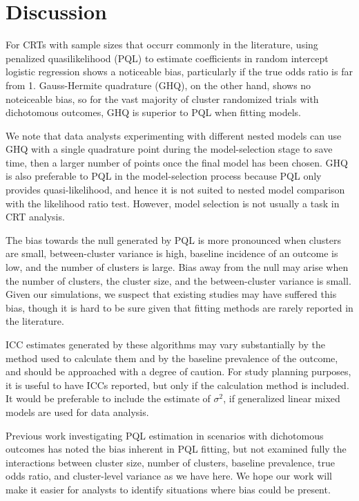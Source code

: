 \documentclass[Afour,times,sagev,doublespace]{sagej}
\begin{document}
\section{Discussion}

For CRTs with sample sizes that occurr commonly in the literature, using penalized quasilikelihood (PQL) to estimate coefficients in random intercept logistic regression shows a noticeable bias, particularly if the true odds ratio is far from 1. Gauss-Hermite quadrature (GHQ), on the other hand, shows no noteiceable bias, so for the vast majority of cluster randomized trials with dichotomous outcomes, GHQ is superior to PQL when fitting models. 

We note that data analysts experimenting with different nested models can use GHQ with a single quadrature point during the model-selection stage to save time, then a larger number of points once the final model has been chosen. GHQ is also preferable to PQL in the model-selection process because PQL only provides quasi-likelihood, and hence it is not suited to nested model comparison with the likelihood ratio test. However, model selection is not usually a task in CRT analysis.

The bias towards the null generated by PQL is more pronounced when clusters are small, between-cluster variance is high, baseline incidence of an outcome is low, and the number of clusters is large. Bias away from the null may arise when the number of clusters, the cluster size, and the between-cluster variance is small. Given our simulations, we suspect that existing studies may have suffered this bias, though it is hard to be sure given that fitting methods are rarely reported in the literature. 

ICC estimates generated by these algorithms may vary substantially by the method used to calculate them and by the baseline prevalence of the outcome, and should be approached with a degree of caution.  For study planning purposes, it is useful to have ICCs reported, but only if the calculation method is included.  It would be preferable to include the estimate of $\sigma^2$, if generalized linear mixed models are used for data analysis.


Previous work investigating PQL estimation in scenarios with dichotomous outcomes has noted the bias inherent in PQL fitting, \cite{jang_numerical_2009,zhang_fitting_2011} but not examined fully the interactions between cluster size, number of clusters, baseline prevalence, true odds ratio, and cluster-level variance as we have here. We hope our work will make it easier for analysts to identify situations where bias could be present.
\end{document}
